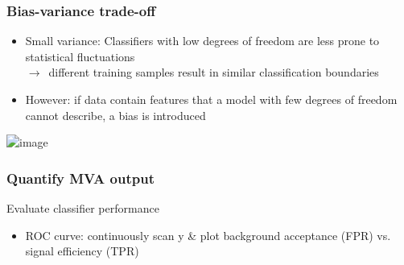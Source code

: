 \documentclass{beamer}
\begin{document}

\begin{frame}
    \frametitle{Bias-variance trade-off}
    \begin{itemize}
        \item Small variance: Classifiers with low degrees of freedom are less prone to statistical fluctuations\\$\to$~different training samples result in similar classification boundaries 
        \item However: if data contain features that a model with few degrees of freedom cannot describe, a bias is introduced
    \end{itemize}
    \vspace*{3mm}
    \centering\includegraphics<1>[height=3.0cm,keepaspectratio]{pics/Overfitting}%
\end{frame}



\begin{frame}
    \frametitle{Quantify MVA output}
    \begin{block}{Evaluate classifier performance}
        \begin{itemize}
            \item ROC curve: continuously scan y \& plot background acceptance (FPR) vs. signal efficiency (TPR)
                
        \end{itemize}
    \end{block}
    \vspace*{2mm}
    \centering{}
\end{frame}
\end{document}
